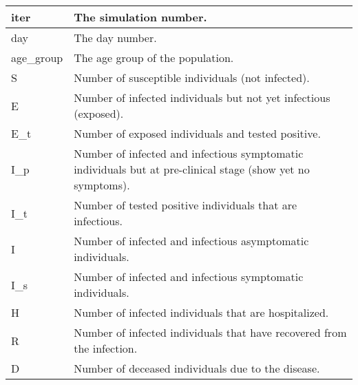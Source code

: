 \begin{table}[tb!]
{\begin{tabular}{|l|p{9.25cm}|}
            iter          & The simulation number.
            \\
            \hline
            day           & The day number.
            \\
            \hline
            age\_group    & The age group of the population.
            \\
            \hline
            S             & Number of susceptible individuals (not infected).                                                           \\
            \hline
            E             & Number of infected individuals but not yet infectious (exposed).                                            \\
            \hline
            E\_t          & Number of exposed individuals and tested positive.                                                          \\
            \hline
            I\_p          & Number of infected and infectious symptomatic individuals but at pre-clinical stage (show yet no symptoms). \\
            \hline
            I\_t          & Number of tested positive individuals that are infectious.                                                  \\
            \hline
            I            & Number of infected and infectious asymptomatic individuals.                                    \\
            \hline
            I\_s         & Number of infected and infectious symptomatic individuals.                                     \\
            \hline
            H             & Number of infected individuals that are hospitalized.                                                       \\
            \hline
            R             & Number of infected individuals that have recovered from the infection.                                      \\
            \hline
            D             & Number of deceased individuals due to the disease.                                                          \\
            \hline
        \end{tabular}%
    }
\end{table}


